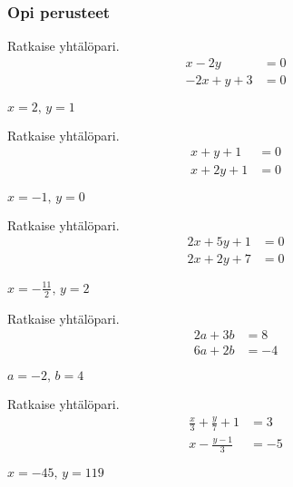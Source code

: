 \begin{tehtavasivu}

\subsubsection*{Opi perusteet}

\begin{tehtava}
    Ratkaise yhtälöpari.
    \begin{align*}
        x-2y &= 0 \\
        -2x+y+3 &=0
    \end{align*}
    \begin{vastaus}
        $x = 2, \, y = 1$
    \end{vastaus}
\end{tehtava}

\begin{tehtava}
    Ratkaise yhtälöpari.
    \begin{align*}
        x+y+1 &= 0 \\
        x+2y+1 &=0
    \end{align*}
    \begin{vastaus}
        $x = -1, \, y = 0$
    \end{vastaus}
\end{tehtava}

\begin{tehtava}
    Ratkaise yhtälöpari.
    \begin{align*}
        2x+5y+1 &= 0 \\
        2x+2y+7 &=0
    \end{align*}
    \begin{vastaus}
        $x = -\frac{11}{2}, \, y = 2$
    \end{vastaus}
\end{tehtava}

\begin{tehtava}
    Ratkaise yhtälöpari.
    \begin{align*}
        2a+3b &= 8 \\
        6a+2b &= -4
    \end{align*}
    \begin{vastaus}
        $a = -2, \, b = 4$
    \end{vastaus}
\end{tehtava}

\begin{tehtava}
    Ratkaise yhtälöpari.
    \begin{align*}
        \frac{x}{3}+\frac{y}{7} + 1 &= 3 \\
        x - \frac{y-1}{3} &= -5
    \end{align*}
    \begin{vastaus}
        $x = -45, \, y = 119$
    \end{vastaus}
\end{tehtava}


\end{tehtavasivu}
